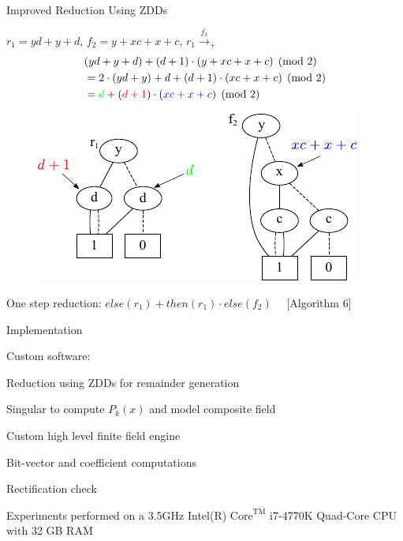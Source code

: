 \begin{frame}{\large{Improved Reduction Using ZDDs}}
\bi
  \item $r_1=yd + y + d$, $f_2=y + xc + x + c$, $r_1 \xrightarrow{f_2}_+$
        {\small
        \begin{align*}
          & (yd + y + d) + (d + 1)\cdot(y + xc + x + c) \pmod{2}\\
          &= 2\cdot(yd + y) + d + (d+1)\cdot(xc + x + c) \pmod{2}\\
          &= \textcolor{green}{d} + (\textcolor{red}{d+1})\cdot(\textcolor{blue}{xc + x + c})  \pmod{2}
        \end{align*}
        }
\ei
\begin{figure}[hbt]
\centering
\includegraphics[scale=0.9]{r1_f2_2.pdf}
\label{f2}
\end{figure}
\bi
  \item One step reduction: $else(r_1) + then(r_1)\cdot else(f_2)$ ~~[Algorithm 6]
\ei
\end{frame}

\begin{frame}{\large Implementation}
\bi
	\item Custom software: 
	\bi
		\pause
		\vspace{0.1in}
		\item Reduction using ZDDs for remainder generation
		\vspace{0.1in}
		\pause
		\item Singular to compute $P_k(x)$ and model composite field
		\vspace{0.1in}
		\pause
		\item Custom high level finite field engine 
		\pause
		\bi
		\item Bit-vector and coefficient computations
		\item Rectification check
		\ei
	\ei
	\pause
	\item Experiments performed on a 3.5GHz 
	Intel(R) $\text{Core}^{\text{TM}}$ i7-4770K Quad-Core CPU with 32 GB RAM
\ei
\end{frame}

